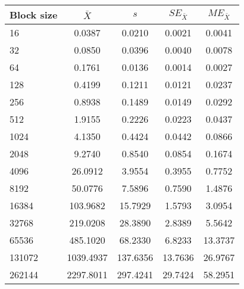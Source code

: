 \begin{tabular}{lcccc}\toprule
{\small Block size} & $\bar{X}$ & $s$ & $SE_{\bar{X}}$ & $ME_{\bar{X}}$ \\\midrule
16 & 0.0387 & 0.0210 & 0.0021 & 0.0041\\
32 & 0.0850 & 0.0396 & 0.0040 & 0.0078\\
64 & 0.1761 & 0.0136 & 0.0014 & 0.0027\\
128 & 0.4199 & 0.1211 & 0.0121 & 0.0237\\
256 & 0.8938 & 0.1489 & 0.0149 & 0.0292\\
512 & 1.9155 & 0.2226 & 0.0223 & 0.0437\\
1024 & 4.1350 & 0.4424 & 0.0442 & 0.0866\\
2048 & 9.2740 & 0.8540 & 0.0854 & 0.1674\\
4096 & 26.0912 & 3.9554 & 0.3955 & 0.7752\\
8192 & 50.0776 & 7.5896 & 0.7590 & 1.4876\\
16384 & 103.9682 & 15.7929 & 1.5793 & 3.0954\\
32768 & 219.0208 & 28.3890 & 2.8389 & 5.5642\\
65536 & 485.1020 & 68.2330 & 6.8233 & 13.3737\\
131072 & 1039.4937 & 137.6356 & 13.7636 & 26.9767\\
262144 & 2297.8011 & 297.4241 & 29.7424 & 58.2951\\
\bottomrule
\end{tabular}
